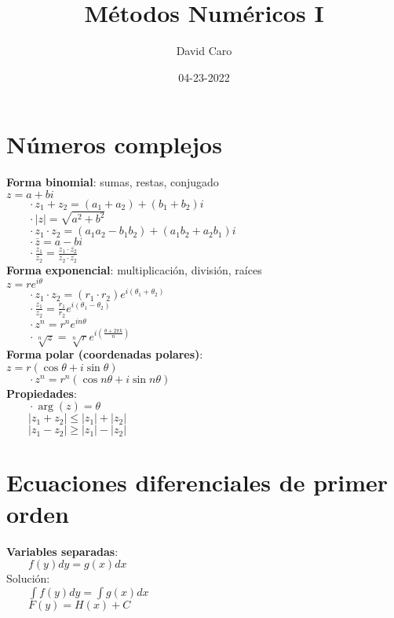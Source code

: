 \documentclass[a4paper,landscape,10pt]{cheatsheet}
\title{Métodos Numéricos I}
\author{David Caro}
\date{04-23-2022}
\begin{document}
\maketitle

\section{Números complejos}
\textbf{Forma binomial}: sumas, restas, conjugado\\
$z=a+bi$\\
$\qquad \cdot z_1+z_2=(a_1+a_2)+(b_1+b_2)i$\\
$\qquad \cdot |z|=\sqrt{a^2+b^2}$\\
$\qquad \cdot z_1\cdot z_2=(a_1a_2-b_1b_2)+(a_1b_2+a_2b_1)i$\\
$\qquad \cdot \overline{z}=a-bi$\\
$\qquad \cdot \frac{z_1}{z_2}=\frac{z_1 \cdot \overline{z_2}}{z_2 \cdot \overline{z_2}}$\\
\textbf{Forma exponencial}: multiplicación, división, raíces\\
$z=re^{i\theta}$ \\
$\qquad \cdot z_1 \cdot z_2=(r_1 \cdot r_2) e^{i(\theta_1+\theta_2)} $\\
$\qquad \cdot \frac{z_1}{z_2}=\frac{r_1}{r_2} e^{i(\theta_1-\theta_2)}$\\
$\qquad \cdot z^n=r^ne^{in\theta}$\\
$\qquad \cdot \sqrt[n]{z}=\sqrt[n]{r}e^{i\left(\frac{\theta+2\pi k}{n}\right)}$\\
\textbf{Forma polar (coordenadas polares)}: \\
$z=r(\cos\theta+i\sin\theta)$\\
$\qquad \cdot z^n=r^n(\cos n\theta+i\sin n\theta)$\\
\textbf{Propiedades}:\\
$\qquad \cdot \arg(z)=\theta$\\
$\qquad |z_1 + z_2| \leq |z_1| + |z_2|$\\
$\qquad |z_1 - z_2| \geq |z_1| - |z_2|$\\
\textbf{}


\section{Ecuaciones diferenciales de primer orden}
\textbf{Variables separadas}:\\
$\qquad f(y)dy=g(x)dx$\\
Solución:\\
$\qquad \int f(y)dy=\int g(x)dx$\\
$\qquad F(y)=H(x)+C$\\
\end{document}

